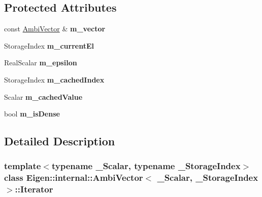 \subsection*{Protected Attributes}
\begin{DoxyCompactItemize}
\item 
\mbox{\label{class_eigen_1_1internal_1_1_ambi_vector_1_1_iterator_ae0c986c92867edda906d703d4d1806ec}} 
const \hyperlink{class_eigen_1_1internal_1_1_ambi_vector}{Ambi\+Vector} \& {\bfseries m\+\_\+vector}
\item 
\mbox{\label{class_eigen_1_1internal_1_1_ambi_vector_1_1_iterator_ac830f5372f90d74d9fde178e92da4a94}} 
Storage\+Index {\bfseries m\+\_\+current\+El}
\item 
\mbox{\label{class_eigen_1_1internal_1_1_ambi_vector_1_1_iterator_ae1b2966ffa93413df690dfe6351bab79}} 
Real\+Scalar {\bfseries m\+\_\+epsilon}
\item 
\mbox{\label{class_eigen_1_1internal_1_1_ambi_vector_1_1_iterator_a234f49172c6f1540bbc5799ef7928d05}} 
Storage\+Index {\bfseries m\+\_\+cached\+Index}
\item 
\mbox{\label{class_eigen_1_1internal_1_1_ambi_vector_1_1_iterator_a1acd30f0d40f023eaf16e85e46ab1f14}} 
Scalar {\bfseries m\+\_\+cached\+Value}
\item 
\mbox{\label{class_eigen_1_1internal_1_1_ambi_vector_1_1_iterator_a49a8f2a6ad0822711f974524f73835fa}} 
bool {\bfseries m\+\_\+is\+Dense}
\end{DoxyCompactItemize}


\subsection{Detailed Description}
\subsubsection*{template$<$typename \+\_\+\+Scalar, typename \+\_\+\+Storage\+Index$>$\newline
class Eigen\+::internal\+::\+Ambi\+Vector$<$ \+\_\+\+Scalar, \+\_\+\+Storage\+Index $>$\+::\+Iterator}


